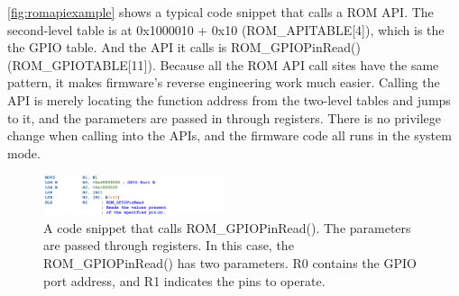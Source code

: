 \autoref{fig:romapiexample} shows a typical code snippet that calls a ROM API. The second-level table is at 0x1000010 + 0x10 (ROM\_APITABLE[4]), which is the the GPIO table. And the API it calls is ROM\_GPIOPinRead() (ROM\_GPIOTABLE[11]). Because all the ROM API call sites have the same pattern, it makes firmware's reverse engineering work much easier.  Calling the API is merely locating the function address from the two-level tables and jumps to it, and the parameters are passed in through registers. There is no privilege change when calling into the APIs, and the firmware code all runs in the system mode.


\begin{figure}[th]
	\includegraphics[width=0.47\textwidth]{figures/romapiexample2}
	\centering
	\caption{A code snippet that calls ROM\_GPIOPinRead(). The parameters are passed through registers. In this case, the  ROM\_GPIOPinRead() has two parameters. R0 contains the GPIO port address, and R1 indicates the pins to operate.}
	\label{fig:romapiexample}
\end{figure}




%
%
%
%


